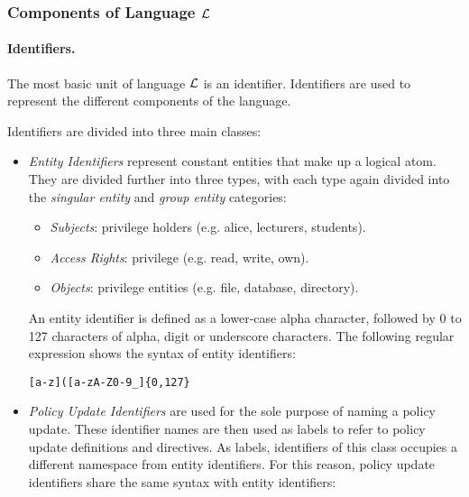 \documentclass[10pt, twocolumn]{article}
\begin{document}
      \subsubsection{Components of Language $\cal{L}$}

        \paragraph{Identifiers.}
          The most basic unit of language $\cal{L}$ is an identifier.
          Identifiers are used to represent the different components of the
          language.  
    
          Identifiers are divided into three main classes:

          \begin{itemize}
            \item
              {\em Entity Identifiers} represent constant entities that make up
              a logical atom. They are divided further into three types, with
              each type again divided into the {\em singular entity} and
              {\em group entity} categories:

              \begin{itemize}
                \item
                  {\em Subjects}: privilege holders (e.g. alice, lecturers,
                  students).
                \item
                  {\em Access Rights}: privilege (e.g. read, write, own).
                \item
                  {\em Objects}: privilege entities (e.g. file, database,
                  directory).
              \end{itemize}

              An entity identifier is defined as a lower-case alpha character,
              followed by 0 to 127 characters of alpha, digit or underscore
              characters. The following regular expression shows the syntax
              of entity identifiers:

              \begin{verbatim}[a-z]([a-zA-Z0-9_]{0,127}\end{verbatim}

            \item
              {\em Policy Update Identifiers} are used for the sole purpose of
              naming a policy update. These identifier names are then used as
              labels to refer to policy update definitions and directives. As
              labels, identifiers of this class occupies a different namespace
              from entity identifiers. For this reason, policy update
              identifiers share the same syntax with entity identifiers:


\end{itemize}
\end{document}
